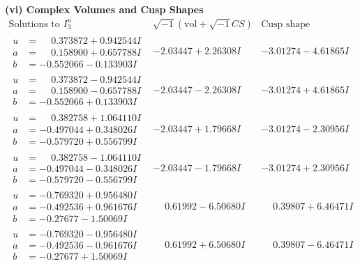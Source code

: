 \documentclass[1p]{elsarticle_modified}
\theoremstyle{definition}
\newcommand{\I}{\sqrt{-1}}
\begin{document}
\newpage\flushleft \textbf{(vi) Complex Volumes and Cusp Shapes}
$$\begin{array}{c|c|c}  
\text{Solutions to }I^u_{3}& \I (\text{vol} + \sqrt{-1}CS) & \text{Cusp shape}\\
 \hline 
\begin{aligned}
u &= \phantom{-}0.373872 + 0.942544 I \\
a &= \phantom{-}0.158900 + 0.657788 I \\
b &= -0.552066 - 0.133903 I\end{aligned}
 & -2.03447 + 2.26308 I & -3.01274 - 4.61865 I \\ \hline\begin{aligned}
u &= \phantom{-}0.373872 - 0.942544 I \\
a &= \phantom{-}0.158900 - 0.657788 I \\
b &= -0.552066 + 0.133903 I\end{aligned}
 & -2.03447 - 2.26308 I & -3.01274 + 4.61865 I \\ \hline\begin{aligned}
u &= \phantom{-}0.382758 + 1.064110 I \\
a &= -0.497044 + 0.348026 I \\
b &= -0.579720 + 0.556799 I\end{aligned}
 & -2.03447 + 1.79668 I & -3.01274 - 2.30956 I \\ \hline\begin{aligned}
u &= \phantom{-}0.382758 - 1.064110 I \\
a &= -0.497044 - 0.348026 I \\
b &= -0.579720 - 0.556799 I\end{aligned}
 & -2.03447 - 1.79668 I & -3.01274 + 2.30956 I \\ \hline\begin{aligned}
u &= -0.769320 + 0.956480 I \\
a &= -0.492536 + 0.961676 I \\
b &= -0.27677 - 1.50069 I\end{aligned}
 & \phantom{-}0.61992 - 6.50680 I & \phantom{-}0.39807 + 6.46471 I \\ \hline\begin{aligned}
u &= -0.769320 - 0.956480 I \\
a &= -0.492536 - 0.961676 I \\
b &= -0.27677 + 1.50069 I\end{aligned}
 & \phantom{-}0.61992 + 6.50680 I & \phantom{-}0.39807 - 6.46471 I \\ \hline\begin{aligned}

\end{aligned}
\end{array}$$
\end{document}
